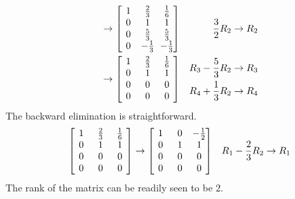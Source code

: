 \begin{solution}
\begin{align*}
&\to
\left[\begin{array}{@{\,}wc{10pt}wc{10pt}wc{10pt}@{\,}}
1 & \frac{2}{3} & \frac{1}{6} \\
0 & 1 & 1 \\
0 & \frac{5}{3} & \frac{5}{3} \\
0 & -\frac{1}{3} & -\frac{1}{3}
\end{array}\right]
& \frac{3}{2}R_2 \to R_2 \\
&\to
\left[\begin{array}{@{\,}wc{10pt}wc{10pt}wc{10pt}@{\,}}
1 & \frac{2}{3} & \frac{1}{6} \\
0 & 1 & 1 \\
0 & 0 & 0 \\
0 & 0 & 0
\end{array}\right]
&
\begin{aligned}
R_3 - \frac{5}{3}R_2 &\to R_3\\
R_4 + \frac{1}{3}R_2 &\to R_4     
\end{aligned}
\end{align*}
The backward elimination is straightforward.
\begin{align*}
\left[\begin{array}{@{\,}wc{10pt}wc{10pt}wc{10pt}@{\,}}
1 & \frac{2}{3} & \frac{1}{6} \\
0 & 1 & 1 \\
0 & 0 & 0 \\
0 & 0 & 0
\end{array}\right] 
&\to
\left[\begin{array}{@{\,}wc{10pt}wc{10pt}wc{10pt}@{\,}}
1 & 0 & -\frac{1}{2} \\
0 & 1 & 1 \\
0 & 0 & 0 \\
0 & 0 & 0
\end{array}\right]
& R_1 - \frac{2}{3}R_2 \to R_1
\end{align*}
The rank of the matrix can be readily seen to be $2$.
\end{solution}

